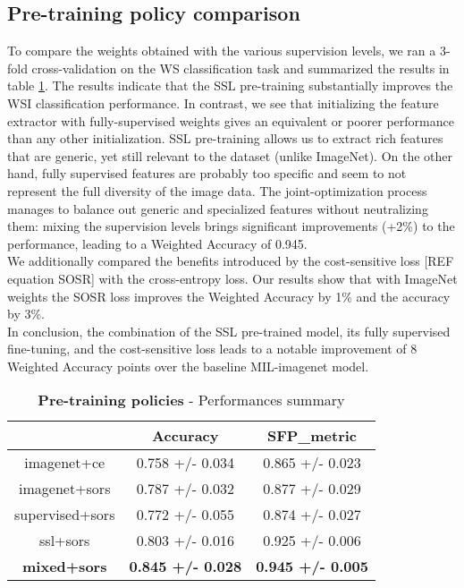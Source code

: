 \subsection{Pre-training policy comparison}
To compare the weights obtained with the various supervision levels, we ran a 3-fold cross-validation on the WS classification task and  summarized the results in table \ref{tab:pretraining}. 
The results indicate that the SSL pre-training substantially improves the WSI classification performance. In contrast, we see that initializing the feature extractor with fully-supervised weights gives an equivalent or poorer performance than any other initialization. SSL pre-training allows us to extract rich features that are generic, yet still relevant to the dataset  (unlike ImageNet). On the other hand, fully supervised features are probably too specific and seem to not represent the full diversity of the image data. The joint-optimization process manages to balance out generic and specialized features without neutralizing them: mixing the supervision levels brings significant improvements (+2\%) to the performance, leading to a Weighted Accuracy of 0.945. \\
We additionally compared the benefits introduced by the cost-sensitive loss [REF equation SOSR] with the cross-entropy loss. Our results show that with ImageNet weights the SOSR loss improves the Weighted Accuracy by 1\% and the accuracy by 3\%. \\
In conclusion, the combination of the SSL pre-trained model, its fully supervised fine-tuning, and the cost-sensitive loss leads to a notable improvement of 8 Weighted Accuracy points over the baseline MIL-imagenet model.


\begin{table}[!t]
\centering
\begin{tabular}{ccc}
\hline
                    & \textbf{Accuracy}        & \textbf{SFP\_metric}     \\ \hline
imagenet+ce         & 0.758 +/- 0.034          & 0.865 +/- 0.023          \\
imagenet+sors       & 0.787 +/- 0.032          & 0.877 +/- 0.029          \\
supervised+sors     & 0.772 +/- 0.055          & 0.874 +/- 0.027          \\
ssl+sors            & 0.803 +/- 0.016          & 0.925 +/- 0.006          \\
\textbf{mixed+sors} & \textbf{0.845 +/- 0.028} & \textbf{0.945 +/- 0.005} \\ \hline
\end{tabular}

\caption{\textbf{Pre-training policies} - Performances summary}
\label{tab:pretraining}
\end{table}

